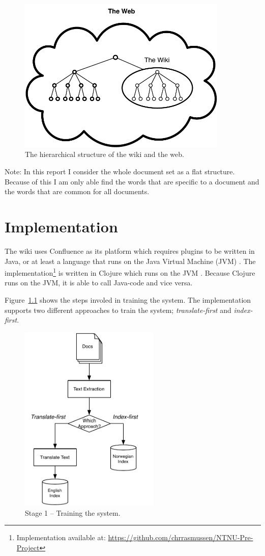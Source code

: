 \documentclass[a4paper]{book}
\begin{document}
\begin{figure}[H]
\center
\includegraphics[width=10cm]{figs/hierarchical_structure.pdf}
\caption{The hierarchical structure of the wiki and the web.}
\label{fig:hierarchicalStructure}
\end{figure}

Note: In this report I consider the whole document set as a flat structure. Because of this I am only able find the words that are specific to a document and the words that are common for all documents.

\chapter{Implementation}
\label{cha:implementation}

The wiki uses Confluence as its platform which requires plugins to be written in Java, or at least a language that runs on the Java Virtual Machine (JVM) \cite{createPlugin}. The implementation\footnote{Implementation available at: \url{https://github.com/chrrasmussen/NTNU-Pre-Project}} is written in Clojure which runs on the JVM \cite{aboutClojure}. Because Clojure runs on the JVM, it is able to call Java-code and vice versa.

Figure~\ref{fig:trainingSystem} shows the steps involed in training the system. The implementation supports two different approaches to train the system; \textit{translate-first} and \textit{index-first}.
\begin{figure}[H]
\centering
\includegraphics[height=9cm]{figs/stage1.pdf}
\caption{Stage 1 -- Training the system.}
\label{fig:trainingSystem}
\end{figure}
\end{document}

